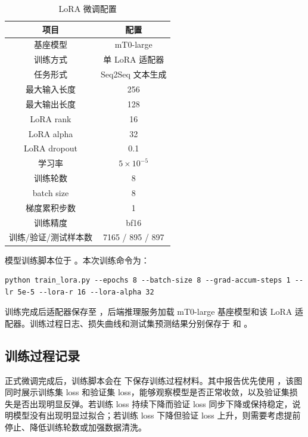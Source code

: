 \documentclass[12pt,a4paper]{ctexart}
\begin{document}
\begin{table}[H]
\centering
\caption{LoRA 微调配置}
\begin{tabular}{c|c}
\toprule
项目 & 配置 \\
\midrule
基座模型 & mT0-large \\
训练方式 & 单 LoRA 适配器 \\
任务形式 & Seq2Seq 文本生成 \\
最大输入长度 & 256 \\
最大输出长度 & 128 \\
LoRA rank & 16 \\
LoRA alpha & 32 \\
LoRA dropout & 0.1 \\
学习率 & $5\times10^{-5}$ \\
训练轮数 & 8 \\
batch size & 8 \\
梯度累积步数 & 1 \\
训练精度 & bf16 \\
训练/验证/测试样本数 & 7165 / 895 / 897 \\
\bottomrule
\end{tabular}
\end{table}

模型训练脚本位于 。本次训练命令为：

\begin{lstlisting}[language={},caption={LoRA 微调命令}]
python train_lora.py --epochs 8 --batch-size 8 --grad-accum-steps 1 --lr 5e-5 --lora-r 16 --lora-alpha 32
\end{lstlisting}

训练完成后适配器保存至 ，后端推理服务加载 mT0-large 基座模型和该 LoRA 适配器。训练过程日志、损失曲线和测试集预测结果分别保存于  和 。

\subsection{训练过程记录}

正式微调完成后，训练脚本会在  下保存训练过程材料。其中报告优先使用 ，该图同时展示训练集 loss 和验证集 loss，能够观察模型是否正常收敛，以及验证集损失是否出现明显反弹。若训练 loss 持续下降而验证 loss 同步下降或保持稳定，说明模型没有出现明显过拟合；若训练 loss 下降但验证 loss 上升，则需要考虑提前停止、降低训练轮数或加强数据清洗。
\end{document}
